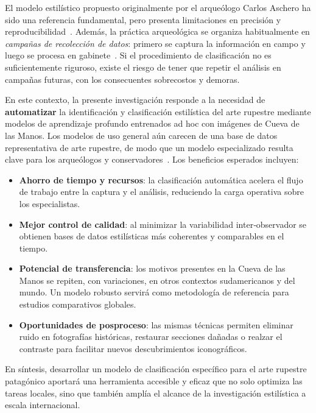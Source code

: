 El modelo estilístico propuesto originalmente por el arqueólogo Carlos Aschero ha sido una referencia fundamental, pero presenta limitaciones en precisión y reproducibilidad~\cite{aschero2000}.
Además, la práctica arqueológica se organiza habitualmente en \emph{campañas de recolección de datos}: primero se captura la información en campo y luego se procesa en gabinete~\cite{aschero1998}.
Si el procedimiento de clasificación no es suficientemente riguroso, existe el riesgo de tener que repetir el análisis en campañas futuras, con los consecuentes sobrecostos y demoras.

En este contexto, la presente investigación responde a la necesidad de \textbf{automatizar} la identificación y clasificación estilística del arte rupestre mediante modelos de aprendizaje profundo entrenados ad hoc con imágenes de Cueva de las Manos.
Los modelos de uso general aún carecen de una base de datos representativa de arte rupestre, de modo que un modelo especializado resulta clave para los arqueólogos y conservadores~\cite{aschero2018}.
Los beneficios esperados incluyen:

\begin{itemize}
  \item \textbf{Ahorro de tiempo y recursos}: la clasificación automática acelera el flujo de trabajo entre la captura y el análisis, reduciendo la carga operativa sobre los especialistas.
  \item \textbf{Mejor control de calidad}: al minimizar la variabilidad inter‐observador se obtienen bases de datos estilísticas más coherentes y comparables en el tiempo.
  \item \textbf{Potencial de transferencia}: los motivos presentes en la Cueva de las Manos se repiten, con variaciones, en otros contextos sudamericanos y del mundo.  Un modelo robusto servirá como metodología de referencia para estudios comparativos globales.
  \item \textbf{Oportunidades de posproceso}: las mismas técnicas permiten eliminar ruido en fotografías históricas, restaurar secciones dañadas o realzar el contraste para facilitar nuevos descubrimientos iconográficos.
\end{itemize}

En síntesis, desarrollar un modelo de clasificación específico para el arte rupestre patagónico aportará una herramienta accesible y eficaz que no solo optimiza las tareas locales, sino que también amplía el alcance de la investigación estilística a escala internacional.
